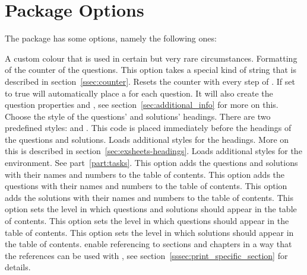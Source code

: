 \documentclass[DIV10,toc=index,toc=bib,numbers=noendperiod]{cnpkgdoc}
\begin{document}
\section{Package Options}\label{sec:options}
The package \ExSheets has some options, namely the following ones:
\begin{beschreibung}
    A custom colour that is used in certain but very rare circumstances.
    Formatting of the counter of the questions.  This option takes a special
    kind of string that is described in section~\ref{ssec:counter}.
  \Default{}
    Resets the  counter with every step of .
    If set to true \ExSheets will automatically place a 
    for each question.  It will also create the question properties 
    and , see section~\ref{sec:additional_info} for more on
    this.
    Choose the style of the questions' and solutions' headings.  There are two
    predefined styles:  and .
    This code is placed immediately before the headings of the questions and
    solutions.
    Loads additional styles for the headings.  More on this is described in
    section~\ref{sec:exsheets-headings}.
    Loads additional styles for the  environment.  See
    part~\ref{part:tasks}.
    This option adds the questions and solutions with their names and numbers
    to the table of contents.
    This option adds the questions with their names and numbers to the table
    of contents.
    This option adds the solutions with their names and numbers to the table
    of contents.
    This option sets the level in which questions and solutions should appear
    in the table of contents.
    This option sets the level in which questions should appear in the table
    of contents.
    This option sets the level in which solutions should appear in the table
    of contents.
    enable referencing to sections and chapters in a way that the references
    can be used with , see
    section~\ref{sssec:print_specific_section} for details.
\end{beschreibung}
\end{document}
